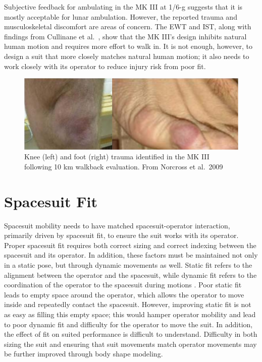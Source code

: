 \documentclass[defaultstyle,11pt]{comps}
\begin{document}
Subjective feedback for ambulating in the MK III at 1/6-g suggests that it is mostly acceptable for lunar ambulation.
However, the reported trauma and musculoskeletal discomfort are areas of concern.
The EWT and IST, along with findings from Cullinane et al.~\citep{Cullinane2017}, show that the MK III's design inhibits natural human motion and requires more effort to walk in.
It is not enough, however, to design a suit that more closely matches natural human motion; it also needs to work closely with its operator to reduce injury risk from poor fit.

\begin{figure}
\hypertarget{fig:B-Trauma}{%
\centering
\includegraphics{../fig/Background/Trauma.png}
\caption{Knee (left) and foot (right) trauma identified in the MK III following 10 km walkback evaluation. From Norcross et al.~2009}\label{fig:B-Trauma}
}
\end{figure}

\hypertarget{spacesuit-fit}{%
\section{Spacesuit Fit}\label{spacesuit-fit}}

Spacesuit mobility needs to have matched spacesuit-operator interaction, primarily driven by spacesuit fit, to ensure the suit works with its operator.
Proper spacesuit fit requires both correct sizing and correct indexing between the spacesuit and its operator.
In addition, these factors must be maintained not only in a static pose, but through dynamic movements as well.
Static fit refers to the alignment between the operator and the spacesuit, while dynamic fit refers to the coordination of the operator to the spacesuit during motions \citep{Stirling2020}.
Poor static fit leads to empty space around the operator, which allows the operator to move inside and repeatedly contact the spacesuit.
However, improving static fit is not as easy as filling this empty space; this would hamper operator mobility and lead to poor dynamic fit and difficulty for the operator to move the suit.
In addition, the effect of fit on suited performance is difficult to understand.
Difficulty in both sizing the suit and ensuring that suit movements match operator movements may be further improved through body shape modeling.
\end{document}
